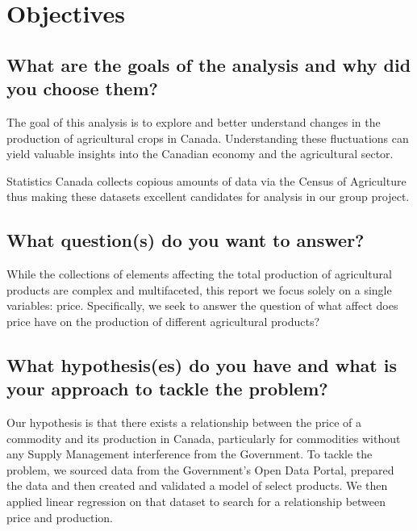 \section{Objectives}

\subsection{What are the goals of the analysis and why did you choose them?}

The goal of this analysis is to explore and better understand changes in the production of agricultural crops in Canada.
Understanding these fluctuations can yield valuable insights into the Canadian economy and the agricultural sector.

Statistics Canada collects copious amounts of data via the Census of Agriculture~\cite{census} thus making these datasets excellent candidates for analysis in our group project.

\subsection{What question(s) do you want to answer?}

While the collections of elements affecting the total production of agricultural products are complex and multifaceted, this report we focus solely on a single variables: price.
Specifically, we seek to answer the question of what affect does price have on the production of different agricultural products?

\subsection{What hypothesis(es) do you have and what is your approach to tackle the problem?}

Our hypothesis is that there exists a relationship between the price of a commodity and its production in Canada, particularly for commodities without any Supply Management interference from the Government.
To tackle the problem, we sourced data from the Government's Open Data Portal, prepared the data and then created and validated a model of select products.
We then applied linear regression on that dataset to search for a relationship between price and production.
